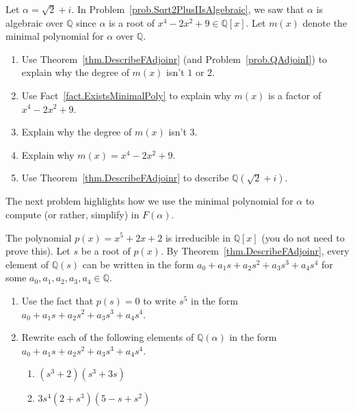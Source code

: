 \begin{problem}\label{prob.DescribeQAdjoinSqrt2PlusI}
Let $\alpha = \sqrt{2} + i$. In Problem~\ref{prob.Sqrt2PlusIIsAlgebraic}, we saw that $\alpha$ is algebraic over $\mathbb{Q}$ since $\alpha$ is a root of  $x^4-2x^2+9\in \mathbb{Q}[x]$. Let $m(x)$ denote the minimal polynomial for $\alpha$ over $\mathbb{Q}$.
\begin{enumerate}
\item Use Theorem~\ref{thm.DescribeFAdjoinr} (and Problem~\ref{prob.QAdjoinI}) to explain why the degree of $m(x)$ isn't $1$ or $2$.
\item Use Fact~\ref{fact.ExistsMinimalPoly} to explain why $m(x)$ is a factor of $x^4-2x^2+9$.
\item Explain why the degree of $m(x)$ isn't $3$.
\item Explain why  $m(x)=x^4-2x^2+9$.
\item Use Theorem~\ref{thm.DescribeFAdjoinr} to describe $\mathbb{Q}(\sqrt{2} + i)$.
\end{enumerate}
\end{problem}

The next problem highlights how we use the minimal polynomial for $\alpha$ to compute (or rather, simplify) in  $F(\alpha)$.

\begin{problem}\label{prob.DescribeQRootx52x2}
The polynomial $p(x) = x^5 + 2x + 2$ is irreducible in $\mathbb{Q}[x]$ (you do not need to prove this). Let $s$ be a root of $p(x)$. By Theorem~\ref{thm.DescribeFAdjoinr}, every element of $\mathbb{Q}(s)$ can be written in the form $a_0 + a_1s + a_2s^2 + a_3s^3 + a_4s^4$ for some $a_0,a_1,a_2,a_3,a_4 \in \mathbb{Q}$.
\begin{enumerate}
\item Use the fact that $p(s) = 0$ to write $s^5$ in the form  $a_0 + a_1s + a_2s^2 + a_3s^3 + a_4s^4$.
\item Rewrite each of the following elements of $\mathbb{Q}(\alpha)$ in the form  $a_0 + a_1s + a_2s^2 + a_3s^3 + a_4s^4$.
\begin{enumerate}
\item $(s^3+2)(s^3+3s)$
\item $3s^4(2+s^3)(5-s+s^2)$
\end{enumerate}
\end{enumerate}
\end{problem}

